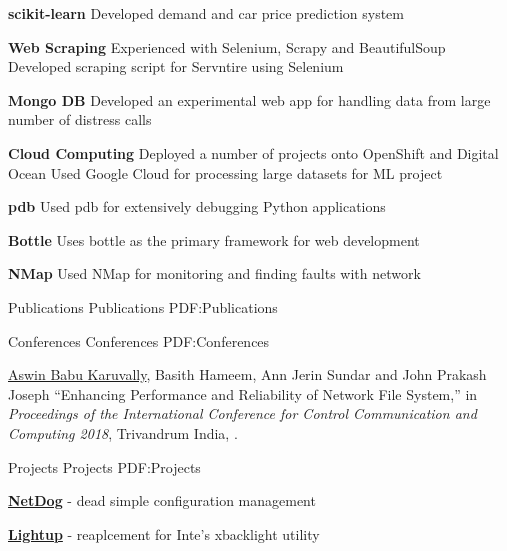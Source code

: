 \documentclass[letterpaper,MMMyyyy,nonstopmode]{simpleresumecv}
\begin{document}
\begin{Body}
\BigGap
\BulletItem
\textbf{scikit-learn}
\SubBulletItem
Developed demand and car price prediction system

\BigGap
\BulletItem
\textbf{Web Scraping}
\SubBulletItem
Experienced with Selenium, Scrapy and BeautifulSoup
\SubBulletItem
Developed scraping script for Servntire using Selenium

\BigGap
\BulletItem
\textbf{Mongo DB}
\SubBulletItem
Developed an experimental web app for handling data from large number of
distress calls

\BigGap
\BulletItem
\textbf{Cloud Computing}
\SubBulletItem
Deployed a number of projects onto OpenShift and Digital Ocean
\SubBulletItem
Used Google Cloud for processing large datasets for ML project

\BigGap
\BulletItem
\textbf{pdb}
\SubBulletItem
Used pdb for extensively debugging Python applications

\BigGap
\BulletItem
\textbf{Bottle}
\SubBulletItem
Uses bottle as the primary framework for web development

\BigGap
\BulletItem
\textbf{NMap}
\SubBulletItem
Used NMap for monitoring and finding faults with network


\pagebreak
\Section
{Publications}
{Publications}
{PDF:Publications}

\SubSection
{Conferences}
{Conferences}
{PDF:Conferences}

\begingroup
\renewcommand{\MaxNumberedItem}{[8888]}

\NumberedItem{[1]}
{\underline{Aswin Babu Karuvally}, Basith Hameem, Ann Jerin Sundar and John
Prakash Joseph ``Enhancing Performance and Reliability of Network File System,''
in \textit{Proceedings of the International Conference for Control Communication
and Computing 2018}, Trivandrum India,
.}

\endgroup


\BigGap
\Section
{Projects}
{Projects}
{PDF:Projects}

\BulletItem
\href{https://github.com/karuvally/project_green}
{\textbf{NetDog}} - dead simple configuration management
\hfill
{}

\BigGap
\BulletItem
\href{https://github.com/karuvally/lightup}
{\textbf{Lightup}} - reaplcement for Inte's xbacklight utility
\hfill
{}


\end{Body}
\end{document}
